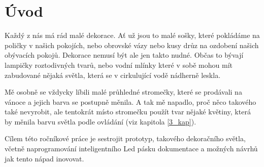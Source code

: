 \chapter*{Úvod}

Každý z nás má rád malé dekorace. Ať už jsou to malé sošky, které pokládáme na poličky v našich pokojích, nebo obrovské vázy nebo kusy drůz na ozdobení našich obývacích pokojů. Dekorace nemusí být ale jen takto nudné. Občas to bývají lampičky roztodivných tvarů, nebo vodní mlínky které v sobě mohou mít zabudované nějaká světla, která se v cirkulující vodě \cite{schommers} nádherně leskla.

Mě osobně se vždycky líbili malé průhledné stromečky, které se prodávali na vánoce a jejich barva se postupně měnila. A tak mě napadlo, proč něco takového také nevyrobit, ale tentokrát místo stromečku použít tvar nějaké květiny, která by měnila barvu světla podle ovládání (viz kapitola \ref{3_kap}).

Cílem této ročníkové práce je sestrojit prototyp, takového dekoračního světla, včetně naprogramování inteligentního Led pásku dokumentace a možných návrhů jak tento nápad inovovat.

%
%
\newpage
